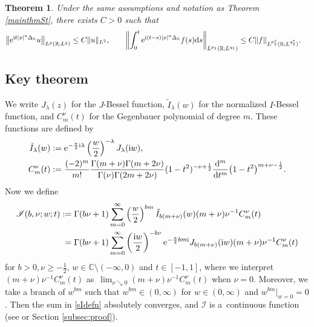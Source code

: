 \documentclass[10pt,a4paper]{amsart}
\numberwithin{equation}{section}
\newtheorem{Theorem}{Theorem}[section]
\def\R{\mathbb{R}}%
\def\l{\lambda}
\def\n{\nu}
\newcommand{\sI}{\mathscr{I}}
\begin{document}
\begin{Theorem}\label{coroSt}
Under the same assumptions and notation as Theorem {\rm\ref{mainthmSt}}, there exists $C>0$ such that
\begin{align*}
&\big\|{\rm e}^{{\rm i}t|x|^a\Delta_k}u\big\|_{L^p(\R; L^q)}\leq C\|u\|_{L^2},\qquad\left\|\int_{0}^t{\rm e}^{{\rm i}(t-s)|x|^a\Delta_k}f(s){\rm d}s \right\|_{L^{p_1}(\R; L^{q_1})} \leq C\|f\|_{L^{p_2^*}(\R; L^{q_2^*})}.
\end{align*}
\end{Theorem}


\subsection{Key theorem}
We write $J_{\lambda}(z)$ for the $J$-Bessel function, $\tilde{I}_{\lambda}(w)$ for the normalized $I$-Bessel function, and $C^{\nu}_m(t)$ for
the Gegenbauer polynomial of degree $m$.
These functions are defined by
\begin{align*}
\tilde{I}_{\lambda}(w):={}&{\rm e}^{-\frac{\pi}{2}{\rm i}\l}\left(\frac{w}{2}\right)^{-\l}J_{\l}({\rm i}w),\\
C^{\nu}_m(t):={}&\frac{(-2)^m}{m!}\frac{\Gamma(m+\nu)\Gamma(m+2\nu)}{\Gamma(\nu)\Gamma(2m+2\nu)}(1-t^2)^{-\nu+\frac{1}{2}}\frac{{\rm d}^m}{{\rm d}t^m}\bigl(1-t^2\bigr)^{m+\nu-\frac{1}{2}}.
\end{align*}
Now we define
\begin{align}\label{sIdefn}
\sI(b,\nu;w;t):={}&
\Gamma(b\nu+1)\sum_{m=0}^{\infty}\left(\frac{w}{2}\right)^{bm}\tilde{I}_{b(m+\nu)}(w)(m+\nu)\n^{-1}C^{\nu}_m(t)\\
={}&\Gamma(b\nu+1)\sum_{m=0}^{\infty}\left(\frac{{\rm i}w}{2}\right)^{-b\nu}{\rm e}^{-\frac{\pi}{2}bm {\rm i}}J_{b(m+\nu)}({\rm i}w)(m+\nu)\n^{-1}C^{\nu}_m(t)\notag
\end{align}
for $b>0,\n\geq -\frac{1}{2}$, $w\in\mathbb{C}\setminus (-\infty,0)$ and $t\in [-1,1]$, where we interpret $(m+\nu)\nu^{-1}C^{\nu}_m(t)$ as~${\lim_{\n\searrow 0}(m+\nu)\n^{-1}C^{\nu}_m(t)}$ when $\n=0$. Moreover, we take a branch of $w^{bm}$ such that $w^{bm}\in (0,\infty)$ for $w\in (0,\infty)$ and $w^{bm}|_{w=0}=0$.
Then the sum in \eqref{sIdefn} absolutely converges, and $\sI$ is a~continuous function (see \cite[Lemma 4.17\,(1)]{BKO} or Section \ref{subsec:proof}).
\end{document}
